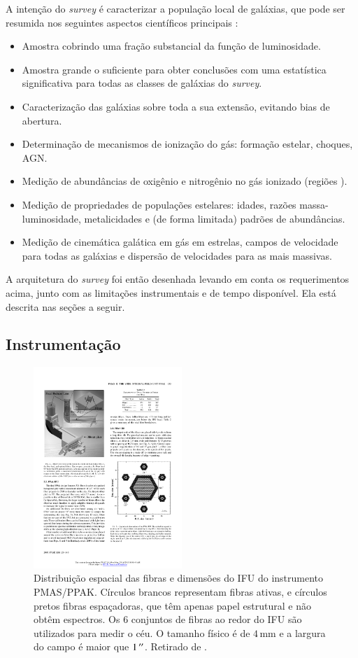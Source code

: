 A intenção do {\em survey} é caracterizar a população local de galáxias, que
pode ser resumida nos seguintes aspectos científicos principais
\citep{Sanchez2012}:
\begin{itemize}
  \item Amostra cobrindo uma fração substancial da função de luminosidade.
  \item Amostra grande o suficiente para obter conclusões com uma estatística
  significativa para todas as classes de galáxias do {\em survey}.
  \item Caracterização das galáxias sobre toda a sua extensão, evitando bias de
  abertura.
  \item Determinação de mecanismos de ionização do gás: formação estelar,
  choques, AGN.
  \item Medição de abundâncias de oxigênio e nitrogênio no gás ionizado (regiões
  \HII).
  \item Medição de propriedades de populações estelares: idades, razões
  massa-luminosidade, metalicidades e (de forma limitada) padrões de
  abundâncias.
  \item Medição de cinemática galática em gás em estrelas, campos de velocidade
  para todas as galáxias e dispersão de velocidades para as mais massivas.
\end{itemize}
A arquitetura do {\em survey} foi então desenhada levando em conta os
requerimentos acima, junto com as limitações instrumentais e de tempo
disponível. Ela está descrita nas seções a seguir.

\subsection{Instrumentação}
\label{sec:ifs:instrumentacao}

\begin{figure}
	\includegraphics[width=0.5\textwidth]{figuras/PPAK}
	\caption[Distribuição das fibras no instrumento PMAS/PPAK]
	{Distribuição espacial das fibras e dimensões do IFU do instrumento PMAS/PPAK.
	Círculos brancos representam fibras ativas, e círculos pretos fibras
	espaçadoras, que têm apenas papel estrutural e não obtêm espectros. Os 6
	conjuntos de fibras ao redor do IFU são utilizados para medir o céu. O tamanho
	físico é de $4\,\mathrm{mm}$ e a largura do campo é maior que $1\,^{\prime\prime}$.
	Retirado de	\citet{Kelz2006}.}
	\label{fig:PPAK}
\end{figure}

